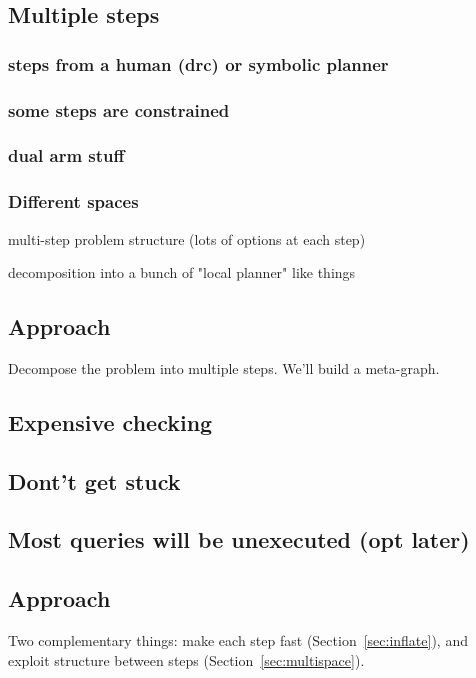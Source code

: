 \documentclass{article}
\begin{document}
\subsection{Multiple steps}

\subsubsection{steps from a human (drc) or symbolic planner}
\subsubsection{some steps are constrained}
\subsubsection{dual arm stuff}
\subsubsection{Different spaces}

multi-step problem structure (lots of options at each step)

decomposition into a bunch of "local planner" like things

\subsection{Approach}

Decompose the problem into multiple steps.
We'll build a meta-graph.

\subsection{Expensive checking}

\subsection{Dont't get stuck}

\subsection{Most queries will be unexecuted (opt later)}

\subsection{Approach}

Two complementary things:
make each step fast (Section~\ref{sec:inflate}),
and exploit structure between steps (Section~\ref{sec:multispace}).
\end{document}
